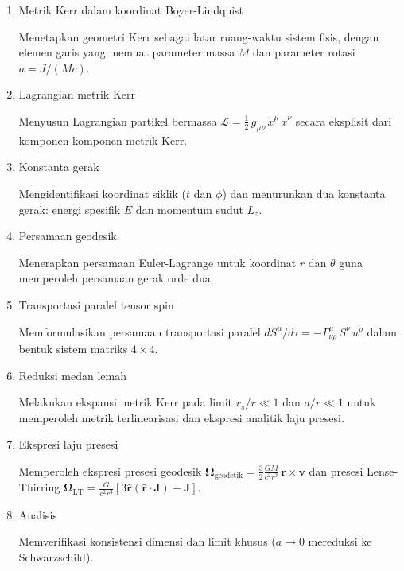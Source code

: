 \begin{enumerate}[label=\arabic*)]
    \item Metrik Kerr dalam koordinat Boyer-Lindquist

    Menetapkan geometri Kerr sebagai latar ruang-waktu sistem fisis, dengan elemen garis yang memuat parameter massa $M$ dan parameter rotasi $a = J/(Mc)$.

    \item Lagrangian metrik Kerr

    Menyusun Lagrangian partikel bermassa $\mathcal{L} = \tfrac{1}{2}\,g_{\mu\nu}\,\dot{x}^\mu\,\dot{x}^\nu$ secara eksplisit dari komponen-komponen metrik Kerr.

    \item Konstanta gerak

    Mengidentifikasi koordinat siklik ($t$ dan $\phi$) dan menurunkan dua konstanta gerak: energi spesifik $E$ dan momentum sudut $L_z$.

    \item Persamaan geodesik

    Menerapkan persamaan Euler-Lagrange untuk koordinat $r$ dan $\theta$ guna memperoleh persamaan gerak orde dua.

    \item Transportasi paralel tensor spin

    Memformulasikan persamaan transportasi paralel $dS^\mu/d\tau = -\Gamma^\mu_{\nu\rho}\, S^\nu\, u^\rho$ dalam bentuk sistem matriks $4 \times 4$.

    \item Reduksi medan lemah

    Melakukan ekspansi metrik Kerr pada limit $r_s/r \ll 1$ dan $a/r \ll 1$ untuk memperoleh metrik terlinearisasi dan ekspresi analitik laju presesi.

    \item Ekspresi laju presesi

    Memperoleh ekspresi presesi geodesik $\bm{\Omega}_{\text{geodetik}} = \frac{3}{2}\frac{GM}{c^2 r^3}\,\mathbf{r}\times\mathbf{v}$ dan presesi Lense-Thirring $\bm{\Omega}_{\text{LT}} = \frac{G}{c^2 r^3}[3\hat{\mathbf{r}}(\hat{\mathbf{r}}\cdot\mathbf{J}) - \mathbf{J}]$.

    \item Analisis

    Memverifikasi konsistensi dimensi dan limit khusus ($a \to 0$ mereduksi ke Schwarzschild).
\end{enumerate}

